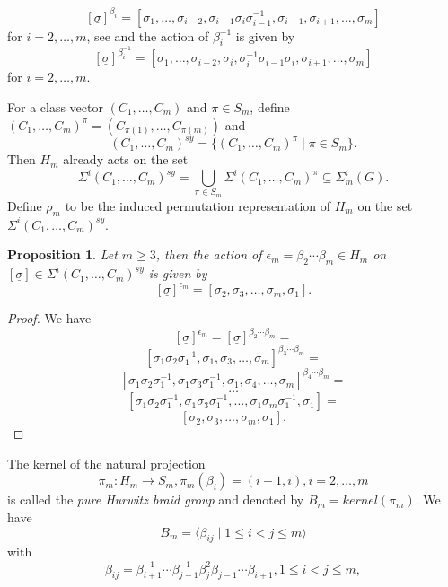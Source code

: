 \documentclass[12pt,a4paper]{article}
\newtheorem{proposition}{Proposition}[section]
\numberwithin{equation}{section}
\numberwithin{table}{section}
\begin{document}
\begin{equation} 
\label{eq:BraidAction}
[\underline{\sigma}]^{\beta_i} = 
[\sigma_1, \dots, \sigma_{i-2}, \sigma_{i-1} \sigma_i \sigma^{-1}_{i-1}, \sigma_{i-1}, \sigma_{i+1}, \dots, \sigma_m]
\end{equation}
for $i = 2, \dots, m$, see \cite[III, 1.2, Theorem 1.6 ff.]{RefMM2018} and the action of $\beta_i^{-1}$ is given by
\begin{equation} 
\label{eq:BraidActionInvers}
[\underline{\sigma}]^{\beta_i^{-1}} = 
[\sigma_1, \dots, \sigma_{i-2}, \sigma_i, \sigma_i^{-1} \sigma_{i-1} \sigma_i, \sigma_{i+1}, \dots, \sigma_m]
\end{equation}
for $i = 2, \dots, m$.
\par
\noindent
For a class vector $(C_1,\dots, C_m)$ and $\pi \in S_m$, define $(C_1,\dots, C_m)^{\pi} = (C_{\pi(1)},\dots, C_{\pi(m)})$ and
$$(C_1,\dots, C_m)^{sy} = \{(C_1,\dots, C_m)^{\pi} \mid \pi \in S_m \}.$$
Then $H_m$ already acts on the set
$$\Sigma^i(C_1,\dots, C_m)^{sy} = \bigcup_{\pi \in S_m} {\Sigma^i(C_1,\dots, C_m)^{\pi}} \subseteq \Sigma^i_m(G).$$
Define $\rho_m$ to be the induced permutation representation of $H_m$ on the set $\Sigma^i(C_1,\dots, C_m)^{sy}$.
\par
\noindent
%
\begin{proposition}
\label{EpsilonHmActsCyclic}
Let $m \geq 3$, then the action of $\epsilon_m = \beta_2 \cdots \beta_m \in H_m$ 
on $[\underline{\sigma}]\in \Sigma^i(C_1,\dots, C_m)^{sy}$ is given by
$$[\underline{\sigma}]^{\epsilon_m} = [\sigma_2,\sigma_3,\dots,\sigma_m,\sigma_1].$$
\end{proposition}
\begin{proof}
We have 
$$[\underline{\sigma}]^{\epsilon_m} = [\underline{\sigma}]^{\beta_2 \cdots \beta_m} =$$
$$[\sigma_1 \sigma_2 \sigma_1^{-1},\sigma_1,\sigma_3,\dots,\sigma_m]^{\beta_3 \cdots \beta_m} =$$
$$[\sigma_1 \sigma_2 \sigma_1^{-1},\sigma_1 \sigma_3 \sigma_1^{-1},\sigma_1,\sigma_4,\dots,\sigma_m]^{\beta_4 \cdots \beta_m} =$$
$$\dots$$
$$[\sigma_1 \sigma_2 \sigma_1^{-1},\sigma_1 \sigma_3 \sigma_1^{-1},\dots,\sigma_1 \sigma_m \sigma_1^{-1},\sigma_1] =$$
$$[\sigma_2,\sigma_3,\dots,\sigma_m,\sigma_1].$$
\end{proof}
%
\noindent
The kernel of the natural projection
$$\pi_m : H_m \rightarrow S_m, \pi_m(\beta_i) = (i-1, i), i = 2, \dots, m$$
is called the {\it pure Hurwitz braid group} and denoted by $B_m = kernel(\pi_m)$.
We have
$$B_m = \langle \beta_{ij} \mid 1 \leq i < j \leq m \rangle$$ with
$$\beta_{ij} = \beta_{i+1}^{-1} \cdots \beta_{j-1}^{-1} \beta_j^2 \beta_{j-1} \cdots \beta_{i+1}, 1 \leq i < j \leq m,$$
\end{document}
